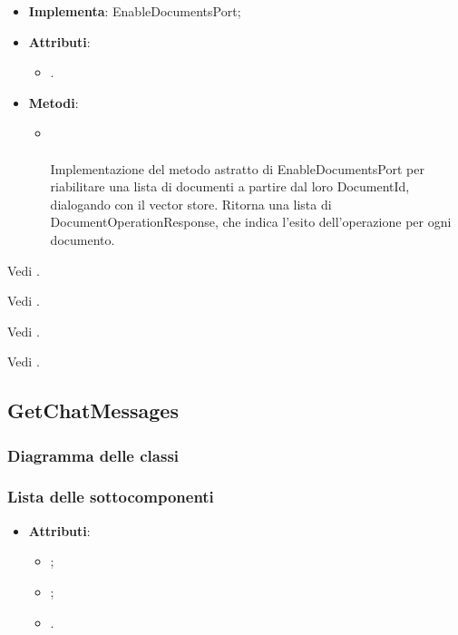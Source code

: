 \documentclass[10pt, a4paper]{article}
\begin{document}
\label{EnableDocumentsVectorStoreDettaglio}
\begin{itemize}
    \item \textbf{Implementa}: EnableDocumentsPort;
    \item \textbf{Attributi}:
    \begin{itemize}
        \item {}.
    \end{itemize}
    \item \textbf{Metodi}:
    \begin{itemize}
        \item {}\\ \\
        Implementazione del metodo astratto di EnableDocumentsPort per riabilitare una lista di documenti a partire dal loro DocumentId, dialogando con il vector store. Ritorna una lista di DocumentOperationResponse, che indica l'esito dell'operazione per ogni documento.
    \end{itemize}
\end{itemize}

Vedi .


Vedi .

Vedi .

Vedi .



\subsection{GetChatMessages}
\subsubsection{Diagramma delle classi}
\subsubsection{Lista delle sottocomponenti}



\label{ChatDettaglio}
\begin{itemize}
    \item \textbf{Attributi}:
    \begin{itemize}
        \item {};
        \item {};
        \item {}.
    \end{itemize}
\end{itemize}
\end{document}

